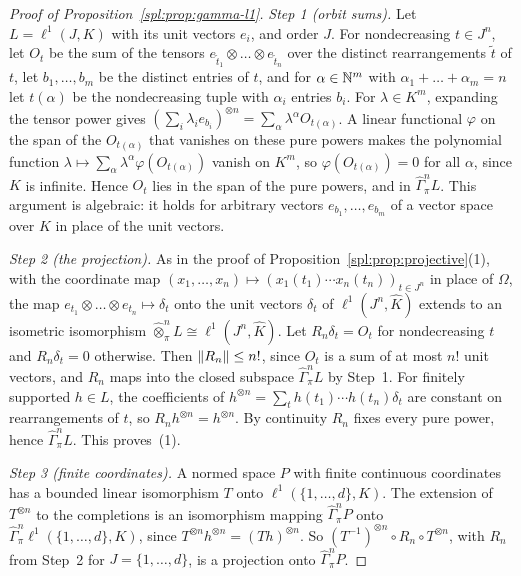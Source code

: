 \begin{proof}[Proof of Proposition~\ref{spl:prop:gamma-l1}]
\emph{Step 1 (orbit sums).} Let $L=\ell^1(J,K)$ with its unit vectors $e_i$, and order $J$. For nondecreasing
$t\in J^n$, let $O_t$ be the sum of the tensors $e_{\tilde t_1}\otimes\dots\otimes e_{\tilde t_n}$ over the distinct
rearrangements $\tilde t$ of $t$, let $b_1,\dots,b_m$ be the distinct entries of $t$, and for $\alpha\in\mathbb N^m$ with
$\alpha_1+\dots+\alpha_m=n$ let $t(\alpha)$ be the nondecreasing tuple with $\alpha_i$ entries $b_i$. For $\lambda\in K^m$,
expanding the tensor power gives $(\sum_i\lambda_ie_{b_i})^{\otimes n}=\sum_\alpha\lambda^\alpha O_{t(\alpha)}$. A linear
functional $\varphi$ on the span of the $O_{t(\alpha)}$ that vanishes on these pure powers makes the polynomial function
$\lambda\mapsto\sum_\alpha\lambda^\alpha\varphi(O_{t(\alpha)})$ vanish on $K^m$, so $\varphi(O_{t(\alpha)})=0$ for all
$\alpha$, since $K$ is infinite. Hence $O_t$ lies in the span of the pure powers, and in $\widehat\Gamma^n_\pi L$. This
argument is algebraic: it holds for arbitrary vectors $e_{b_1},\dots,e_{b_m}$ of a vector space over $K$ in place of
the unit vectors.

\emph{Step 2 (the projection).} As in the proof of Proposition~\ref{spl:prop:projective}(1), with the coordinate map
$(x_1,\dots,x_n)\mapsto(x_1(t_1)\cdots x_n(t_n))_{t\in J^n}$ in place of $\Omega$, the map
$e_{t_1}\otimes\dots\otimes e_{t_n}\mapsto\delta_t$ onto the unit vectors $\delta_t$ of $\ell^1(J^n,\widehat K)$ extends
to an isometric isomorphism $\widehat\otimes^n_\pi L\cong\ell^1(J^n,\widehat K)$. Let $R_n\delta_t=O_t$ for
nondecreasing $t$ and $R_n\delta_t=0$ otherwise. Then $\lVert R_n\rVert\le n!$, since $O_t$ is a sum of at most $n!$ unit
vectors, and $R_n$ maps into the closed subspace $\widehat\Gamma^n_\pi L$ by Step~1. For finitely supported $h\in L$, the
coefficients of $h^{\otimes n}=\sum_th(t_1)\cdots h(t_n)\delta_t$ are constant on rearrangements of $t$, so
$R_nh^{\otimes n}=h^{\otimes n}$. By continuity $R_n$ fixes every pure power, hence $\widehat\Gamma^n_\pi L$. This
proves~(1).

\emph{Step 3 (finite coordinates).} A normed space $P$ with finite continuous coordinates has a bounded linear
isomorphism $T$ onto $\ell^1(\{1,\dots,d\},K)$. The extension of $T^{\otimes n}$ to the completions is an isomorphism
mapping $\widehat\Gamma^n_\pi P$ onto $\widehat\Gamma^n_\pi\ell^1(\{1,\dots,d\},K)$, since
$T^{\otimes n}h^{\otimes n}=(Th)^{\otimes n}$. So $(T^{-1})^{\otimes n}\circ R_n\circ T^{\otimes n}$, with $R_n$ from
Step~2 for $J=\{1,\dots,d\}$, is a projection onto $\widehat\Gamma^n_\pi P$.
\end{proof}

